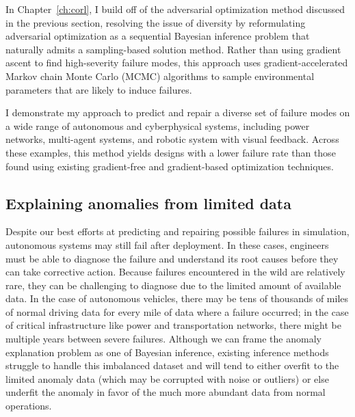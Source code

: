 In Chapter~\ref{ch:corl}, I build off of the adversarial optimization method discussed in the previous section, resolving the issue of diversity by reformulating adversarial optimization as a sequential Bayesian inference problem that naturally admits a sampling-based solution method. Rather than using gradient ascent to find high-severity failure modes, this approach uses gradient-accelerated Markov chain Monte Carlo (MCMC) algorithms to sample environmental parameters that are likely to induce failures. 

I demonstrate my approach to predict and repair a diverse set of failure modes on a wide range of autonomous and cyberphysical systems, including power networks, multi-agent systems, and robotic system with visual feedback. Across these examples, this method yields designs with a lower failure rate than those found using existing gradient-free and gradient-based optimization techniques.

\subsection{Explaining anomalies from limited data}

Despite our best efforts at predicting and repairing possible failures in simulation, autonomous systems may still fail after deployment. In these cases, engineers must be able to diagnose the failure and understand its root causes before they can take corrective action. Because failures encountered in the wild are relatively rare, they can be challenging to diagnose due to the limited amount of available data. In the case of autonomous vehicles, there may be tens of thousands of miles of normal driving data for every mile of data where a failure occurred; in the case of critical infrastructure like power and transportation networks, there might be multiple years between severe failures. Although we can frame the anomaly explanation problem as one of Bayesian inference, existing inference methods struggle to handle this imbalanced dataset and will tend to either overfit to the limited anomaly data (which may be corrupted with noise or outliers) or else underfit the anomaly in favor of the much more abundant data from normal operations.

